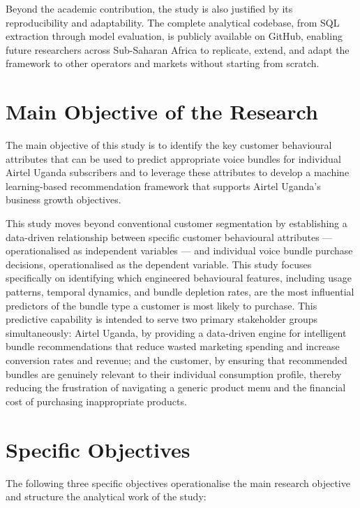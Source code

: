 Beyond the academic contribution, the study is also justified by its
reproducibility and adaptability. The complete analytical codebase, from SQL
extraction through model evaluation, is publicly available on GitHub, enabling
future researchers across Sub-Saharan Africa to replicate, extend, and adapt the
framework to other operators and markets without starting from scratch.

\section{Main Objective of the Research}

The main objective of this study is to identify the key customer behavioural attributes that can be used to predict appropriate voice bundles for individual Airtel Uganda subscribers and to leverage these attributes to develop a machine learning-based recommendation framework that supports Airtel Uganda's business growth objectives.

This study moves beyond conventional customer segmentation by establishing a data-driven relationship between specific customer behavioural attributes --- operationalised as independent variables --- and individual voice bundle purchase decisions, operationalised as the dependent variable. This study focuses specifically on identifying which engineered behavioural features, including usage patterns, temporal dynamics, and bundle depletion rates, are the most influential predictors of the bundle type a customer is most likely to purchase. This predictive capability is intended to serve two primary stakeholder groups simultaneously: Airtel Uganda, by providing a data-driven engine for intelligent bundle recommendations that reduce wasted marketing spending and increase conversion rates and revenue; and the customer, by ensuring that recommended bundles are genuinely relevant to their individual consumption profile, thereby reducing the frustration of navigating a generic product menu and the financial cost of purchasing inappropriate products.


\section{Specific Objectives}

The following three specific objectives operationalise the main research objective and structure the analytical work of the study:

